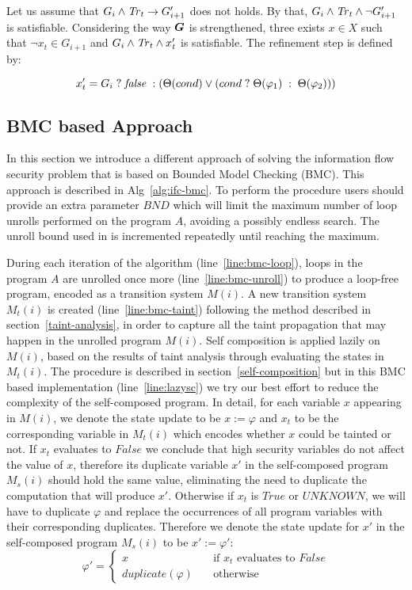 Let us assume that $G_i\land\mathit{Tr}_t\to G_{i+1}'$ does not holds. By that, $G_i\land\mathit{Tr}_t\land\neg G_{i+1}'$ is satisfiable. Considering the way $\vG$ is strengthened,
three exists $x\in X$ such that $\neg x_t\in G_{i+1}$ and $G_i\land\mathit{Tr}_t\land x_t'$ is satisfiable. The refinement step is defined by:

$$ x_t' = G_i\;? \; \mathit{false} \; : \left( \Theta(cond)\lor \left( cond\; ? \; \Theta(\varphi_1) \; : \; \Theta(\varphi_2) \right)\right)$$


\subsection{BMC based Approach}
In this section we introduce a different approach of solving the information flow security problem that is based on Bounded Model Checking (BMC). This approach is described in Alg~\ref{alg:ifc-bmc}.
To perform the \Bmc procedure users should provide an extra parameter $BND$ which will limit the maximum number of loop unrolls performed on the program $A$, avoiding a possibly endless search. The unroll bound used in \Bmc is incremented repeatedly until reaching the maximum. 

During each iteration of the algorithm (line~\ref{line:bmc-loop}), loops in the program $A$ are unrolled once more (line~\ref{line:bmc-unroll}) to produce a loop-free program, encoded as a transition system $M(i)$. A new transition system $M_t(i)$ is created (line~\ref{line:bmc-taint}) following the method described in section~\ref{taint-analysis}, in order to capture all the taint propagation that may happen in the unrolled program $M(i)$. Self composition is applied lazily on $M(i)$, based on the results of taint analysis through evaluating the states in $M_t(i)$. The procedure is described in section~\ref{self-composition} but in this BMC based implementation (line~\ref{line:lazysc}) we try our best effort to reduce the complexity of the self-composed program. In detail, for each variable $x$ appearing in $M(i)$, we denote the state update to be $x := \varphi$ and $x_t$ to be the corresponding variable in $M_t(i)$ which encodes whether $x$ could be tainted or not. If $x_t$ evaluates to $False$ we conclude that high security variables do not affect the value of $x$, therefore its duplicate variable $x'$ in the self-composed program $M_s(i)$ should hold the same value, eliminating the need to duplicate the computation that will produce $x'$. Otherwise if $x_t$ is $True$ or $UNKNOWN$, we will have to duplicate $\varphi$ and replace the occurrences of all program variables with their corresponding duplicates. Therefore we denote the state update for $x'$ in the self-composed program $M_s(i)$ to be $x' := \varphi'$:
\[ \varphi' =
  \begin{cases}
    x       & \quad \text{if } x_t \text{ evaluates to } False\\
    duplicate(\varphi)  & \quad \text{otherwise}
  \end{cases}
\]


